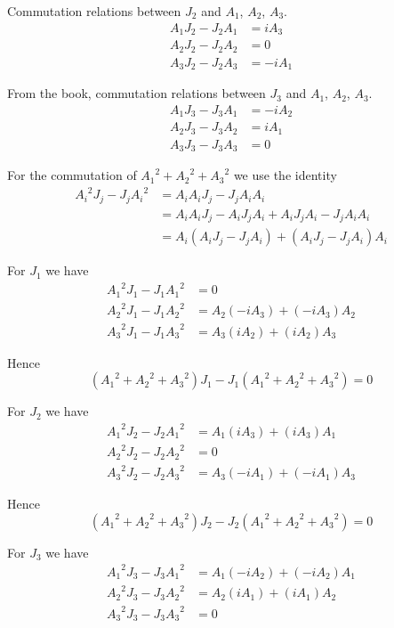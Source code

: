 Commutation relations between $J_2$ and $A_1$, $A_2$, $A_3$.
\begin{align*}
A_1J_2-J_2A_1&=i A_3
\\
A_2J_2-J_2A_2&=0
\\
A_3J_2-J_2A_3&=-iA_1
\end{align*}

From the book, commutation relations between $J_3$ and $A_1$, $A_2$, $A_3$.
\begin{align*}
A_1J_3-J_3A_1&=-iA_2
\\
A_2J_3-J_3A_2&=iA_1
\\
A_3J_3-J_3A_3&=0
\end{align*}

For the commutation of ${A_1}^2+{A_2}^2+{A_3}^2$ we use the identity
\begin{align*}
{A_i}^2J_j-J_j{A_i}^2&=A_iA_iJ_j-J_jA_iA_i
\\
&=A_iA_iJ_j-A_iJ_jA_i+A_iJ_jA_i-J_jA_iA_i
\\
&=A_i(A_iJ_j-J_jA_i)+(A_iJ_j-J_jA_i)A_i
\end{align*}

For $J_1$ we have
\begin{align*}
{A_1}^2J_1-J_1{A_1}^2&=0
\\
{A_2}^2J_1-J_1{A_2}^2&=A_2(-iA_3)+(-iA_3)A_2
\\
{A_3}^2J_1-J_1{A_3}^2&=A_3(iA_2)+(iA_2)A_3
\end{align*}

Hence
\begin{equation*}
\left({A_1}^2+{A_2}^2+{A_3}^2\right)J_1-J_1\left({A_1}^2+{A_2}^2+{A_3}^2\right)=0
\end{equation*}

For $J_2$ we have
\begin{align*}
{A_1}^2J_2-J_2{A_1}^2&=A_1(iA_3)+(iA_3)A_1
\\
{A_2}^2J_2-J_2{A_2}^2&=0
\\
{A_3}^2J_2-J_2{A_3}^2&=A_3(-iA_1)+(-iA_1)A_3
\end{align*}

Hence
\begin{equation*}
\left({A_1}^2+{A_2}^2+{A_3}^2\right)J_2-J_2\left({A_1}^2+{A_2}^2+{A_3}^2\right)=0
\end{equation*}

For $J_3$ we have
\begin{align*}
{A_1}^2J_3-J_3{A_1}^2&=A_1(-iA_2)+(-iA_2)A_1
\\
{A_2}^2J_3-J_3{A_2}^2&=A_2(iA_1)+(iA_1)A_2
\\
{A_3}^2J_3-J_3{A_3}^2&=0
\end{align*}

